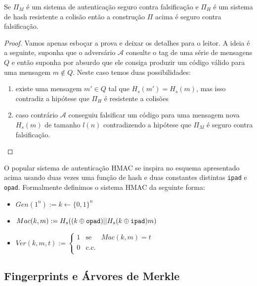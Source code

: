 \begin{theorem}
  Se $\Pi_M$ é um sistema de autenticação seguro contra falsificação e $\Pi_H$ é um sistema de hash resistente a colisão então a construção $\Pi$ acima é seguro contra falsificação. 
\end{theorem}

\begin{proof}
  Vamos apenas esboçar a prova e deixar os detalhes para o leitor.
  A ideia é a seguinte, suponha que o adversário $\mathcal{A}$ consulte o tag de uma série de mensagens $Q$ e então suponha por absurdo que ele consiga produzir um código válido para uma mensagem $m \notin Q$.
  Neste caso temos duas possibilidades:
  \begin{enumerate}
  \item existe uma mensagem $m' \in Q$ tal que $H_s(m') = H_s(m)$, mas isso contradiz a hipótese que $\Pi_H$ é resistente a colisões
  \item caso contrário $\mathcal{A}$ conseguiu falsificar um código para uma mensagem nova $H_s(m)$ de tamanho $l(n)$ contradizendo a hipótese que $\Pi_M$ é seguro contra falsificação.
  \end{enumerate}
\end{proof}

O popular sistema de autenticação HMAC se inspira no esquema apresentado acima usando duas vezes uma função de hash e duas constantes distintas {\tt ipad} e {\tt opad}.
Formalmente definimos o sistema HMAC da seguinte forma:
\begin{itemize}
\item $Gen(1^n) := k \leftarrow \{0,1\}^n$
\item $Mac(k, m) := H_s((k \oplus \textrm{\tt opad}) || H_s(k \oplus \textrm{\tt ipad})m)$
\item $Ver(k, m, t) := \left\{
    \begin{array}{lcl}
      1 & \textrm{se} & Mac(k,m) = t\\
      0 & \textrm{c.c.} &\\
    \end{array}
    \right.$
\end{itemize}


\subsection{Fingerprints e Árvores de Merkle}
\label{label}


